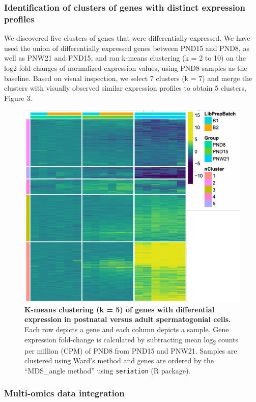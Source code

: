 \documentclass[12pt,twoside]{reedthesis}
\begin{document}
\hypertarget{identification-of-clusters-of-genes-with-distinct-expression-profiles}{%
\subsubsection{Identification of clusters of genes with distinct expression profiles}\label{identification-of-clusters-of-genes-with-distinct-expression-profiles}}

We discovered five clusters of genes that were differentially expressed.
We have used the union of differentially expressed genes between PND15
and PND8, as well as PNW21 and PND15, and ran k-means clustering (k = 2
to 10) on the log2 fold-changes of normalized expression values, using
PND8 samples as the baseline. Based on visual inspection, we select 7
clusters (k = 7) and merge the clusters with visually observed similar
expression profiles to obtain 5 clusters, Figure 3.







\begin{figure}[H]

{\centering \includegraphics{thesis_files/figure-latex/dn3-1} 

}

\caption[K-means clustering of differentiallly expressed genes]{\textbf{K-means clustering (k = 5) of genes with differential expression in postnatal versus adult spermatogonial cells.}
Each row depicts a gene and each column depicts a sample. Gene
expression fold-change is calculated by subtracting mean
log\textsubscript{2} counts per million (CPM) of PND8 from PND15 and
PNW21. Samples are clustered using Ward's method and genes are ordered
by the ``MDS\_angle method'' using \texttt{seriation} (R package).}\label{fig:dn3}
\end{figure}
\hypertarget{multi-omics-data-integration-1}{%
\subsubsection{Multi-omics data integration}\label{multi-omics-data-integration-1}}
\end{document}

